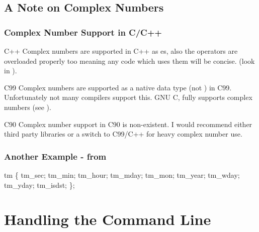 \documentclass[smaller,table]{beamer} %
\begin{document}
\subsection{A Note on Complex Numbers}
\begin{frame}
\frametitle{Complex Number Support in C/C++}
\begin{exampleblock}{C++}
Complex numbers are supported in C++ as {\tt {}}es, also the operators are overloaded properly too meaning any code which uses them will be concise.
(look in {\tt {}}).
\end{exampleblock}

\begin{block}{C99}
Complex numbers are supported as a native data type (not {\tt {}}) in C99. Unfortunately not many compilers support this. GNU C, fully supports complex numbers (see {\tt {}}).
\end{block}

\begin{alertblock}{C90}
Complex number support in C90 is non-existent. I would recommend either third party libraries or a switch to C99/C++ for heavy complex number use.
\end{alertblock}
\end{frame}

\begin{frame}[fragile]
\frametitle{Another Example {\tt {}} - from {\tt {}}}
\begin{semiverbatim}
\footnotesize
{} tm
\{
    tm\_sec;     
    tm\_min;     
    tm\_hour;    
    tm\_mday;    
    tm\_mon;     
    tm\_year;    
    tm\_wday;    
    tm\_yday;    
    tm\_isdst;   
\};
\end{semiverbatim}
\end{frame}

\section{Handling the Command Line}
\end{document}
